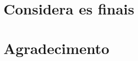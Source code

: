 \documentclass{article}
\begin{document}
\begin{poster}
        \section{Considera es finais}
    
            \lipsum[15]
    
        \section{Agradecimento}
    
            \lipsum[57]
    
        
        
    
    
    \end{poster}
\end{document}
